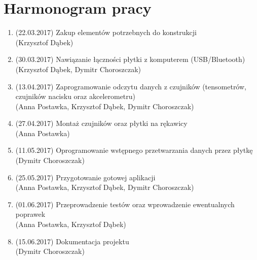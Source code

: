 \documentclass[12pt,a4paper]{article}
\begin{document}
\section{Harmonogram pracy}
\begin{enumerate}
\item (22.03.2017) Zakup elementów potrzebnych do konstrukcji \\(Krzysztof Dąbek)
\item (30.03.2017) Nawiązanie łączności płytki z komputerem (USB/Bluetooth) \\(Krzysztof Dąbek, Dymitr Choroszczak)
\item (13.04.2017) Zaprogramowanie odczytu danych z czujników (tensometrów, czujników nacisku oraz akcelerometru) \\(Anna Postawka, Krzysztof Dąbek, Dymitr Choroszczak) 
\item (27.04.2017) Montaż czujników oraz płytki na rękawicy \\(Anna Postawka)
\item (11.05.2017) Oprogramowanie wstępnego przetwarzania danych przez płytkę \\(Dymitr Choroszczak) 
\item (25.05.2017) Przygotowanie gotowej aplikacji \\(Anna Postawka, Krzysztof Dąbek, Dymitr Choroszczak)
\item (01.06.2017) Przeprowadzenie testów oraz wprowadzenie ewentualnych poprawek \\(Anna Postawka, Krzysztof Dąbek)
\item (15.06.2017) Dokumentacja projektu \\(Dymitr Choroszczak)
\end{enumerate}
\end{document}
